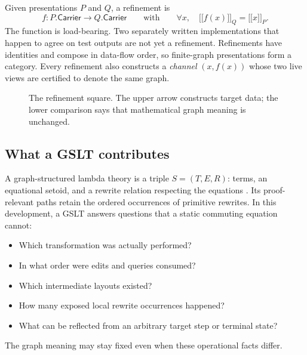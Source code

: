 \documentclass[11pt]{article}
\theoremstyle{remark}
\newcommand{\SG}{\mathsf{SimpleGraph}}
\newcommand{\denote}[1]{\mathopen{[\![}#1\mathclose{]\!]}}
\newcommand{\Fin}{\mathsf{Fin}}
\begin{document}
Given presentations \(P\) and \(Q\), a refinement is
\[
  f : P.\mathsf{Carrier}\to Q.\mathsf{Carrier}
  \qquad\text{with}\qquad
  \forall x,\quad \denote{f(x)}_Q=\denote{x}_P.
\]
The function is load-bearing.  Two separately written implementations that
happen to agree on test outputs are not yet a refinement.  Refinements have
identities and compose in data-flow order, so finite-graph presentations form
a category.  Every refinement also constructs a \emph{channel}
\((x,f(x))\) whose two live views are certified to denote the same graph.

\begin{figure}[htbp]
\centering
{}
\caption{The refinement square.  The upper arrow constructs target data; the
lower comparison says that mathematical graph meaning is unchanged.}
\label{fig:refinement-square}
\end{figure}

\subsection{What a GSLT contributes}

A graph-structured lambda theory is a triple
\(S=(T,E,R)\): terms, an equational setoid, and a rewrite relation respecting
the equations \cite{meredith,turi-plotkin}.  Its proof-relevant paths retain the ordered occurrences of
primitive rewrites.  In this development, a GSLT answers questions that a
static commuting equation cannot:
\begin{itemize}[leftmargin=2em]
  \item Which transformation was actually performed?
  \item In what order were edits and queries consumed?
  \item Which intermediate layouts existed?
  \item How many exposed local rewrite occurrences happened?
  \item What can be reflected from an arbitrary target step or terminal state?
\end{itemize}
The graph meaning may stay fixed even when these operational facts differ.
\end{document}
